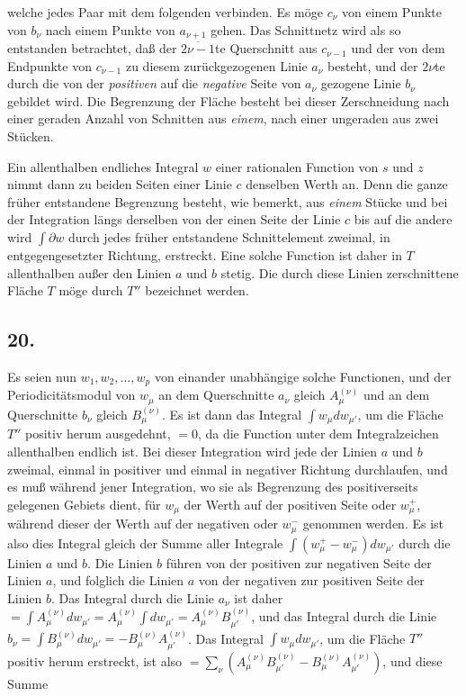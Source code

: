 \documentclass{article}
\begin{document}
welche jedes Paar mit dem folgenden verbinden. Es möge $c_{\nu}$ von einem Punkte von $b_{\nu}$ nach einem Punkte von $a_{\nu+1}$ gehen. Das Schnittnetz wird als so entstanden betrachtet, daß der $\overline{2\nu-1}$te Querschnitt aus $c_{\nu-1}$ und der von dem Endpunkte von $c_{\nu-1}$ zu diesem zurückgezogenen Linie $a_{\nu}$ besteht, und der $2\nu$te durch die von der \emph{positiven} auf die \emph{negative} Seite von $a_{\nu}$ gezogene Linie $b_{\nu}$ gebildet wird. Die Begrenzung der Fläche besteht bei dieser Zerschneidung nach einer geraden Anzahl von Schnitten aus \emph{einem}, nach einer ungeraden aus zwei Stücken.

Ein allenthalben endliches Integral $w$ einer rationalen Function von $s$ und $z$ nimmt dann zu beiden Seiten einer Linie $c$ denselben Werth an. Denn die ganze früher entstandene Begrenzung besteht, wie bemerkt, aus \emph{einem} Stücke und bei der Integration längs derselben von der einen Seite der Linie $c$ bis auf die andere wird $\displaystyle\int \partial w$ durch jedes früher entstandene Schnittelement zweimal, in entgegengesetzter Richtung, erstreckt. Eine solche Function ist daher in $T$ allenthalben außer den Linien $a$ und $b$ stetig. Die durch diese Linien zerschnittene Fläche $T$ möge durch $T''$ bezeichnet werden.

\subsection*{20.}

Es seien nun $w_{1}, w_{2}, \ldots, w_{p}$ von einander unabhängige solche Functionen, und der Periodicitätsmodul von $w_{\mu}$ an dem Querschnitte $a_{\nu}$ gleich $A_{\mu}^{(\nu)}$ und an dem Querschnitte $b_{\nu}$ gleich $B_{\mu}^{(\nu)}$. Es ist dann das Integral $\displaystyle\int w_{\mu} dw_{\mu'}$, um die Fläche $T''$ positiv herum ausgedehnt, $= 0$, da die Function unter dem Integralzeichen allenthalben endlich ist. Bei dieser Integration wird jede der Linien $a$ und $b$ zweimal, einmal in positiver und einmal in negativer Richtung durchlaufen, und es muß während jener Integration, wo sie als Begrenzung des positiverseits gelegenen Gebiets dient, für $w_{\mu}$ der Werth auf der positiven Seite oder $w_{\mu}^{+}$, während dieser der Werth auf der negativen oder $w_{\mu}^{-}$ genommen werden. Es ist also dies Integral gleich der Summe aller Integrale $\displaystyle\int (w_{\mu}^{+} - w_{\mu}^{-}) dw_{\mu'}$ durch die Linien $a$ und $b$. Die Linien $b$ führen von der positiven zur negativen Seite der Linien $a$, und folglich die Linien $a$ von der negativen zur positiven Seite der Linien $b$. Das Integral durch die Linie $a_{\nu}$ ist daher $= \displaystyle\int A_{\mu}^{(\nu)} dw_{\mu'} = A_{\mu}^{(\nu)} \int dw_{\mu'} = A_{\mu}^{(\nu)} B_{\mu'}^{(\nu)}$, und das Integral durch die Linie $b_{\nu} = \displaystyle\int B_{\mu}^{(\nu)} dw_{\mu'} = -B_{\mu}^{(\nu)} A_{\mu'}^{(\nu)}$. Das Integral $\displaystyle\int w_{\mu} dw_{\mu'}$, um die Fläche $T''$ positiv herum erstreckt, ist also $= \displaystyle\sum_{\nu} \left(A_{\mu}^{(\nu)} B_{\mu'}^{(\nu)} - B_{\mu}^{(\nu)} A_{\mu'}^{(\nu)}\right)$, und diese Summe
\end{document}
